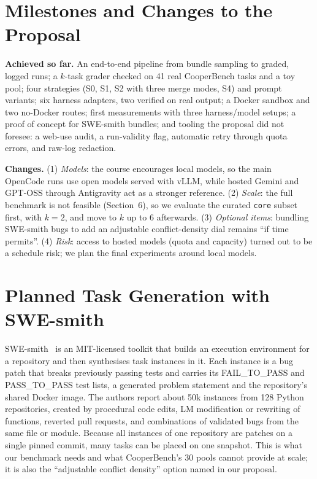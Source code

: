 \documentclass[sigconf,nonacm]{acmart}
\begin{document}
\section{Milestones and Changes to the Proposal}
\textbf{Achieved so far.} An end-to-end pipeline from bundle sampling to graded, logged runs; a $k$-task grader checked on 41 real CooperBench tasks and a toy pool; four strategies (S0, S1, S2 with three merge modes, S4) and prompt variants; six harness adapters, two verified on real output; a Docker sandbox and two no-Docker routes; first measurements with three harness/model setups; a proof of concept for SWE-smith bundles; and tooling the proposal did not foresee: a web-use audit, a run-validity flag, automatic retry through quota errors, and raw-log redaction.

\textbf{Changes.} (1) \emph{Models}: the course encourages local models, so the main OpenCode runs use open models served with vLLM, while hosted Gemini and GPT-OSS through Antigravity act as a stronger reference. (2) \emph{Scale}: the full benchmark is not feasible (Section~6), so we evaluate the curated \texttt{core} subset first, with $k{=}2$, and move to $k$ up to 6 afterwards. (3) \emph{Optional items}: bundling SWE-smith bugs to add an adjustable conflict-density dial remains ``if time permits''. (4) \emph{Risk}: access to hosted models (quota and capacity) turned out to be a schedule risk; we plan the final experiments around local models.

\section{Planned Task Generation with SWE-smith}
SWE-smith~\cite{swesmith} is an MIT-licensed toolkit that builds an execution environment for a repository and then synthesises task instances in it. Each instance is a bug patch that breaks previously passing tests and carries its FAIL\_TO\_PASS and PASS\_TO\_PASS test lists, a generated problem statement and the repository's shared Docker image. The authors report about 50k instances from 128 Python repositories, created by procedural code edits, LM modification or rewriting of functions, reverted pull requests, and combinations of validated bugs from the same file or module. Because all instances of one repository are patches on a single pinned commit, many tasks can be placed on one snapshot. This is what our benchmark needs and what CooperBench's 30 pools cannot provide at scale; it is also the ``adjustable conflict density'' option named in our proposal.
\end{document}
